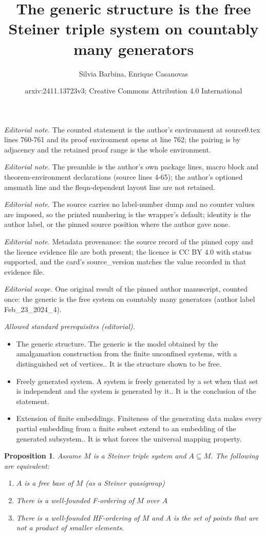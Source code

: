 \documentclass[10pt,a4paper]{article}
\title{The generic structure is the free Steiner triple system on countably many generators}
\author{Silvia Barbina, Enrique Casanovas}
\date{arxiv:2411.13723v3; Creative Commons Attribution 4.0 International}
\theoremstyle{note}
\newtheorem{prop}[thm]{Proposition}
\begin{document}
\maketitle
\noindent\textit{Editorial note.} The counted statement is the author's environment at source0.tex lines 760-761 and its proof environment opens at line 762; the pairing is by adjacency and the retained proof range is the whole environment.\par\medskip
\noindent\textit{Editorial note.} The preamble is the author's own package lines, macro block and theorem-environment declarations (source lines 4-65); the author's optioned amsmath line and the fleqn-dependent layout line are not retained.\par\medskip
\noindent\textit{Editorial note.} The source carries no label-number dump and no counter values are imposed, so the printed numbering is the wrapper's default; identity is the author label, or the pinned source position where the author gave none.\par\medskip
\noindent\textit{Editorial note.} Metadata provenance: the source record of the pinned copy and the licence evidence file are both present; the licence is CC BY 4.0 with status supported, and the card's source\_version matches the value recorded in that evidence file.\par\medskip
\noindent\textit{Editorial scope.} One original result of the pinned author manuscript, counted once: the generic is the free system on countably many generators (author label Feb\_23\_2024\_4).\par\medskip
\noindent\textit{Allowed standard prerequisites (editorial).}\begin{itemize}
\item The generic structure. The generic is the model obtained by the amalgamation construction from the finite unconfined systems, with a distinguished set of vertices.. It is the structure shown to be free.
\item Freely generated system. A system is freely generated by a set when that set is independent and the system is generated by it.. It is the conclusion of the statement.
\item Extension of finite embeddings. Finiteness of the generating data makes every partial embedding from a finite subset extend to an embedding of the generated subsystem.. It is what forces the universal mapping property.
\end{itemize}\medskip
	\begin{prop}\label{May12_2.2}Assume $M$ is a Steiner triple system and $A\subseteq M$. The following are equivalent:
		\begin{enumerate}
			\item $A$ is a free base of $M$ (as a Steiner quasigroup)
			\item There is a well-founded F-ordering of $M$ over $A$
			\item There is a well-founded HF-ordering of $M$ and $A$ is the set of points that are not a product of smaller elements.
		\end{enumerate}
		\end{prop}
\end{document}
